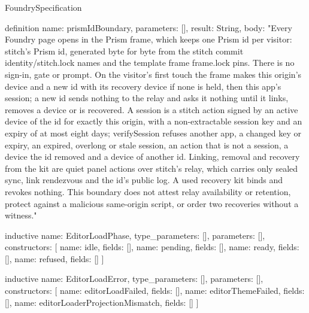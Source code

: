 \begin{lexlean}{FoundrySpecification}
\begin{semanticmodule}
definition{
  name: prismIdBoundary,
  parameters: [],
  result: String,
  body: "Every Foundry page opens in the Prism frame, which keeps one Prism id per visitor: stitch's Prism id, generated byte for byte from the stitch commit identity/stitch.lock names and the template frame frame.lock pins. There is no sign-in, gate or prompt. On the visitor's first touch the frame makes this origin's device and a new id with its recovery device if none is held, then this app's session; a new id sends nothing to the relay and asks it nothing until it links, removes a device or is recovered. A session is a stitch action signed by an active device of the id for exactly this origin, with a non-extractable session key and an expiry of at most eight days; verifySession refuses another app, a changed key or expiry, an expired, overlong or stale session, an action that is not a session, a device the id removed and a device of another id. Linking, removal and recovery from the kit are quiet panel actions over stitch's relay, which carries only sealed sync, link rendezvous and the id's public log. A used recovery kit binds and revokes nothing. This boundary does not attest relay availability or retention, protect against a malicious same-origin script, or order two recoveries without a witness."
}

inductive{
  name: EditorLoadPhase,
  type_parameters: [],
  parameters: [],
  constructors: [
    {name: idle, fields: []},
    {name: pending, fields: []},
    {name: ready, fields: []},
    {name: refused, fields: []}
  ]
}

inductive{
  name: EditorLoadError,
  type_parameters: [],
  parameters: [],
  constructors: [
    {name: editorLoadFailed, fields: []},
    {name: editorThemeFailed, fields: []},
    {name: editorLoaderProjectionMismatch, fields: []}
  ]
}


\end{semanticmodule}
\end{lexlean}

